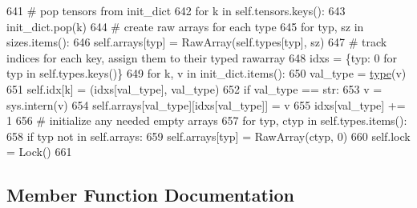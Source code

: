 \begin{DoxyCode}
641             \textcolor{comment}{# pop tensors from init\_dict}
642             \textcolor{keywordflow}{for} k \textcolor{keywordflow}{in} self.tensors.keys():
643                 init\_dict.pop(k)
644             \textcolor{comment}{# create raw arrays for each type}
645             \textcolor{keywordflow}{for} typ, sz \textcolor{keywordflow}{in} sizes.items():
646                 self.arrays[typ] = RawArray(self.types[typ], sz)
647             \textcolor{comment}{# track indices for each key, assign them to their typed rawarray}
648             idxs = \{typ: 0 \textcolor{keywordflow}{for} typ \textcolor{keywordflow}{in} self.types.keys()\}
649             \textcolor{keywordflow}{for} k, v \textcolor{keywordflow}{in} init\_dict.items():
650                 val\_type = \hyperlink{namespaceparlai_1_1agents_1_1tfidf__retriever_1_1build__tfidf_ad5dfae268e23f506da084a9efb72f619}{type}(v)
651                 self.idx[k] = (idxs[val\_type], val\_type)
652                 \textcolor{keywordflow}{if} val\_type == str:
653                     v = sys.intern(v)
654                 self.arrays[val\_type][idxs[val\_type]] = v
655                 idxs[val\_type] += 1
656         \textcolor{comment}{# initialize any needed empty arrays}
657         \textcolor{keywordflow}{for} typ, ctyp \textcolor{keywordflow}{in} self.types.items():
658             \textcolor{keywordflow}{if} typ \textcolor{keywordflow}{not} \textcolor{keywordflow}{in} self.arrays:
659                 self.arrays[typ] = RawArray(ctyp, 0)
660         self.lock = Lock()
661 
\end{DoxyCode}


\subsection{Member Function Documentation}
\mbox{\label{classparlai_1_1agents_1_1legacy__agents_1_1seq2seq_1_1utils__v0_1_1SharedTable_ac40e68dfcfa7680874ee1088642e16ff}} 
